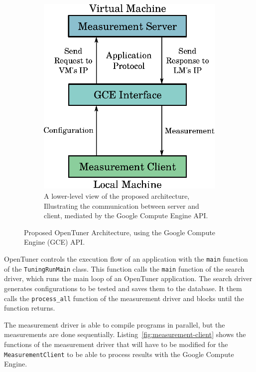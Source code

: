 \documentclass[a4paper, 12pt]{article}
\begin{document}
\begin{figure}[htpb]
\begin{subfigure}{.45\textwidth}
        \includegraphics[scale=.62]{low-level-implementation}
        \caption{A lower-level view of the proposed architecture,
        Illustrating the communication between server and client,
        mediated by the Google Compute Engine API.
        }
        \label{fig:low-level}
    \end{subfigure}%
    \caption{Proposed OpenTuner Architecture,
    using the Google Compute Engine (GCE) API.}
    \label{fig:archs}
\end{figure}

OpenTuner controls the execution flow of an application
with the \texttt{\footnotesize main} function of the
\texttt{\footnotesize TuningRunMain} class. This function
calls the \texttt{\footnotesize main} function of the
search driver, which runs the main loop of an OpenTuner
application. The search driver generates configurations
to be tested and saves them to the database. It them calls
the \texttt{\footnotesize process\_all} function of the
measurement driver and blocks until the function returns.

The measurement driver is able to compile programs in parallel,
but the measurements are done sequentially.
Listing~\ref{fig:measurement-client} shows the functions of
the measurement driver that will have to be modified for the
\texttt{\footnotesize MeasurementClient} to be able to
process results with the Google Compute Engine.
\end{document}
